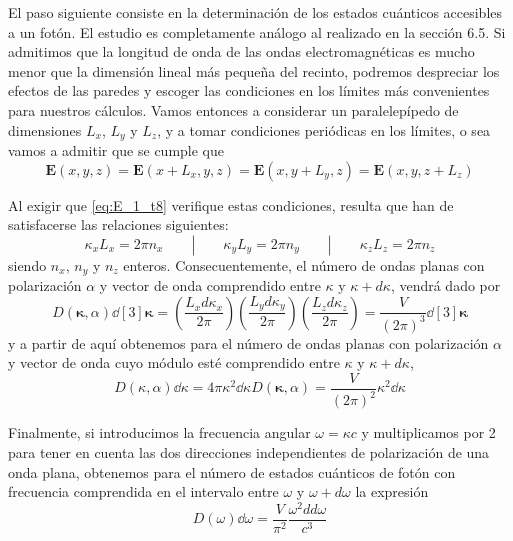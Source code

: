 El paso siguiente consiste en la determinación de los estados cuánticos accesibles a un fotón.
El estudio es completamente análogo al realizado en la sección 6.5.
Si admitimos que la longitud de onda de las ondas electromagnéticas es mucho menor que la dimensión lineal más pequeña del recinto, podremos despreciar los efectos de las paredes y escoger las condiciones en los límites más convenientes para nuestros cálculos.
Vamos entonces a considerar un paralelepípedo de dimensiones $L_x$, $L_y$ y $L_z$, y a tomar condiciones periódicas en los límites, o sea vamos a admitir que se cumple que
\begin{equation}
	\mathbf{E}(x, y, z) = \mathbf{E}(x + L_x, y, z) = \mathbf{E}(x, y + L_y, z) = \mathbf{E}(x, y, z + L_z)
\end{equation}

Al exigir que \eqref{eq:E_1_t8} verifique estas condiciones, resulta que han de satisfacerse las relaciones siguientes:
\begin{equation}
	\kappa_x L_x = 2\pi n_x \qquad | \qquad \kappa_y L_y = 2\pi n_y \qquad | \qquad \kappa_z L_z = 2\pi n_z
\end{equation}
siendo $n_x$, $n_y$ y $n_z$ enteros.
Consecuentemente, el número de ondas planas con polarización $\alpha$ y vector de onda comprendido entre $\kappa$ y $\kappa+d\kappa$, vendrá dado por
\begin{equation}
	D(\bm{\kappa}, \alpha) \dd[3]{\bm{\kappa}} = \left( \frac{L_x d\kappa_x}{2\pi}\right) \left( \frac{L_y d\kappa_y}{2\pi}\right) \left( \frac{L_z d\kappa_z}{2\pi}\right) = \frac{V}{(2\pi)^3} \dd[3]{\bm{\kappa}}
\end{equation}
y a partir de aquí obtenemos para el número de ondas planas con polarización $\alpha$ y vector de onda cuyo módulo esté comprendido entre $\kappa$ y $\kappa+d\kappa$,
\begin{equation}
	D(\kappa, \alpha) \dd{\kappa} = 4\pi \kappa^2 \dd{\kappa} D(\bm{\kappa}, \alpha) = \frac{V}{(2\pi)^2} \kappa^2 \dd{\kappa}
\end{equation}

Finalmente, si introducimos la frecuencia angular $\omega = \kappa c$ y multiplicamos por 2 para tener en cuenta las dos direcciones independientes de polarización de una onda plana, obtenemos para el número de estados cuánticos de fotón con frecuencia comprendida en el intervalo entre $\omega$ y $\omega + d\omega$ la expresión
\begin{equation}\label{eq:d_omega_t8}
	D(\omega) \dd{\omega} = \frac{V}{\pi^2}\frac{\omega^2 dd{\omega}}{c^3}
\end{equation}

